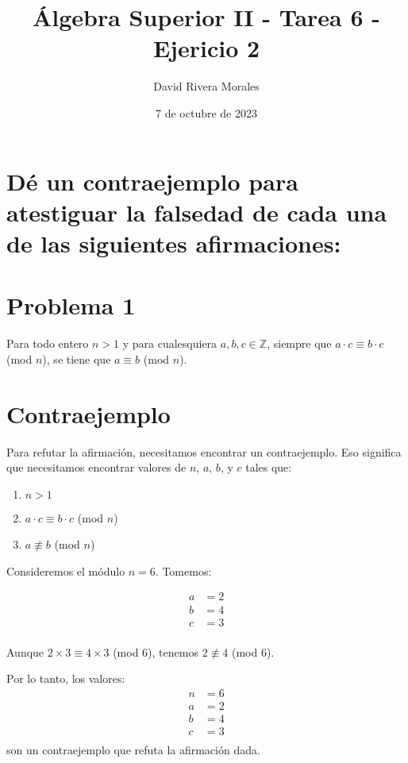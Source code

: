 \documentclass{article}
\title{Álgebra Superior II - Tarea 6 - Ejericio 2}
\author{David Rivera Morales}
\date{7 de octubre de 2023}
\begin{document}
\maketitle

\section*{Dé un contraejemplo para atestiguar la falsedad de cada una de las siguientes afirmaciones:}

\section*{Problema 1}
Para todo entero \( n > 1 \) y para cualesquiera \( a, b, c \in \mathbb{Z} \), siempre que \( a \cdot c \equiv b \cdot c \) (mod \( n \)), se tiene que \( a \equiv b \) (mod \( n \)).

\section*{Contraejemplo}
Para refutar la afirmación, necesitamos encontrar un contraejemplo. Eso significa que necesitamos encontrar valores de \( n \), \( a \), \( b \), y \( c \) tales que:

\begin{enumerate}
    \item \( n > 1 \)
    \item \( a \cdot c \equiv b \cdot c \) (mod \( n \))
    \item \( a \not\equiv b \) (mod \( n \))
\end{enumerate}

Consideremos el módulo \( n = 6 \). Tomemos:

\[
\begin{aligned}
    a &= 2 \\
    b &= 4 \\
    c &= 3 \\
\end{aligned}
\]

Aunque \( 2 \times 3 \equiv 4 \times 3 \) (mod 6), tenemos \( 2 \not\equiv 4 \) (mod 6).

Por lo tanto, los valores:
\[
\begin{aligned}
    n &= 6 \\
    a &= 2 \\
    b &= 4 \\
    c &= 3 \\
\end{aligned}
\]
son un contraejemplo que refuta la afirmación dada.
\end{document}
